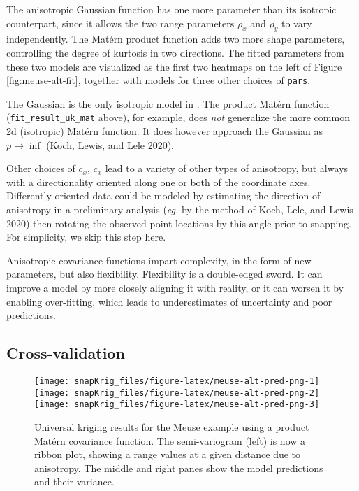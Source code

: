 The anisotropic Gaussian function has one more parameter than its isotropic counterpart, since it allows the two range parameters \(\rho_x\) and \(\rho_y\) to vary independently. The Matérn product function adds two more shape parameters, controlling the degree of kurtosis in two directions. The fitted parameters from these two models are visualized as the first two heatmaps on the left of Figure \ref{fig:meuse-alt-fit}, together with models for three other choices of \texttt{pars}.

The Gaussian is the only isotropic model in . The product Matérn function (\texttt{fit\_result\_uk\_mat} above), for example, does \emph{not} generalize the more common 2d (isotropic) Matérn function. It does however approach the Gaussian as \(p \to \inf\) (Koch, Lewis, and Lele 2020).

Other choices of \(c_x\), \(c_x\) lead to a variety of other types of anisotropy, but always with a directionality oriented along one or both of the coordinate axes. Differently oriented data could be modeled by estimating the direction of anisotropy in a preliminary analysis (\emph{eg.} by the method of Koch, Lele, and Lewis 2020) then rotating the observed point locations by this angle prior to snapping. For simplicity, we skip this step here.

Anisotropic covariance functions impart complexity, in the form of new parameters, but also flexibility. Flexibility is a double-edged sword. It can improve a model by more closely aligning it with reality, or it can worsen it by enabling over-fitting, which leads to underestimates of uncertainty and poor predictions.

\hypertarget{cross-validation}{%
\subsection{Cross-validation}\label{cross-validation}}

\begin{figure}[!bht]
\texttt{[image: snapKrig\_files/figure-latex/meuse-alt-pred-png-1]} \texttt{[image: snapKrig\_files/figure-latex/meuse-alt-pred-png-2]} \texttt{[image: snapKrig\_files/figure-latex/meuse-alt-pred-png-3]} \caption{Universal kriging results for the Meuse example using a product Matérn covariance function. The semi-variogram (left) is now a ribbon plot, showing a range values at a given distance due to anisotropy. The middle and right panes show the model predictions and their variance.}\label{fig:meuse-alt-pred-png}
\end{figure}

